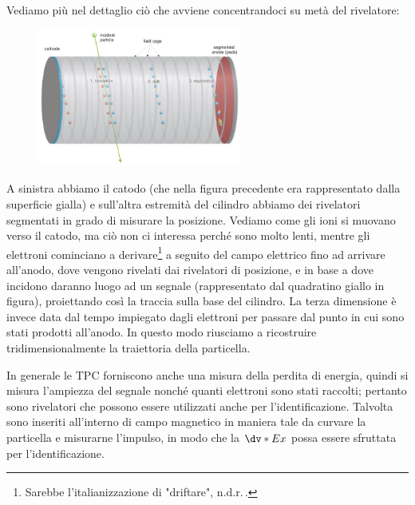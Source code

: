 Vediamo più nel dettaglio ciò che avviene concentrandoci su metà del rivelatore:
\begin{figure}[H]
   \centering
   \includegraphics[width=0.6\textwidth]{immagini/TPC_2.png}
\end{figure}
A sinistra abbiamo il catodo (che nella figura precedente era rappresentato dalla superficie gialla) e sull'altra estremità del cilindro abbiamo dei rivelatori segmentati in grado di misurare la posizione. Vediamo come gli ioni si muovano verso il catodo, ma ciò non ci interessa perché sono molto lenti, mentre gli elettroni cominciano a derivare\footnote{Sarebbe l'italianizzazione di "driftare", n.d.r.\,.} a seguito del campo elettrico fino ad arrivare all'anodo, dove vengono rivelati dai rivelatori di posizione, e in base a dove incidono daranno luogo ad un segnale (rappresentato dal quadratino giallo in figura), proiettando così la traccia sulla base del cilindro. La terza dimensione è invece data dal tempo impiegato dagli elettroni per passare dal punto in cui sono stati prodotti all'anodo. In questo modo riusciamo a ricostruire tridimensionalmente la traiettoria della particella.

In generale le TPC forniscono anche una misura della perdita di energia, quindi si misura l'ampiezza del segnale nonché quanti elettroni sono stati raccolti; pertanto sono rivelatori che possono essere utilizzati anche per l'identificazione. Talvolta sono inseriti all'interno di campo magnetico in maniera tale da curvare la particella e misurarne l'impulso, in modo che la $\dv*{E}{x}$ possa essere sfruttata per l'identificazione.

